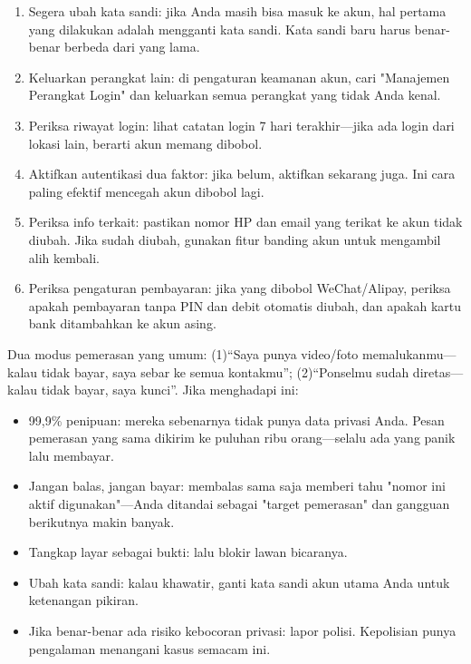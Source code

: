
\begin{enumerate}
  \item Segera ubah kata sandi: jika Anda masih bisa masuk ke akun, hal pertama yang dilakukan adalah mengganti kata sandi. Kata sandi baru harus benar-benar berbeda dari yang lama.
  \item Keluarkan perangkat lain: di pengaturan keamanan akun, cari "Manajemen Perangkat Login" dan keluarkan semua perangkat yang tidak Anda kenal.
  \item Periksa riwayat login: lihat catatan login 7 hari terakhir—jika ada login dari lokasi lain, berarti akun memang dibobol.
  \item Aktifkan autentikasi dua faktor: jika belum, aktifkan sekarang juga. Ini cara paling efektif mencegah akun dibobol lagi.
  \item Periksa info terkait: pastikan nomor HP dan email yang terikat ke akun tidak diubah. Jika sudah diubah, gunakan fitur banding akun untuk mengambil alih kembali.
  \item Periksa pengaturan pembayaran: jika yang dibobol WeChat/Alipay, periksa apakah pembayaran tanpa PIN dan debit otomatis diubah, dan apakah kartu bank ditambahkan ke akun asing.
\end{enumerate}


Dua modus pemerasan yang umum: (1)“Saya punya video/foto memalukanmu—kalau tidak bayar, saya sebar ke semua kontakmu”; (2)“Ponselmu sudah diretas—kalau tidak bayar, saya kunci”. Jika menghadapi ini:

\begin{itemize}
  \item 99,9\% penipuan: mereka sebenarnya tidak punya data privasi Anda. Pesan pemerasan yang sama dikirim ke puluhan ribu orang—selalu ada yang panik lalu membayar.
  \item Jangan balas, jangan bayar: membalas sama saja memberi tahu "nomor ini aktif digunakan"—Anda ditandai sebagai "target pemerasan" dan gangguan berikutnya makin banyak.
  \item Tangkap layar sebagai bukti: lalu blokir lawan bicaranya.
  \item Ubah kata sandi: kalau khawatir, ganti kata sandi akun utama Anda untuk ketenangan pikiran.
  \item Jika benar-benar ada risiko kebocoran privasi: lapor polisi. Kepolisian punya pengalaman menangani kasus semacam ini.
\end{itemize}

